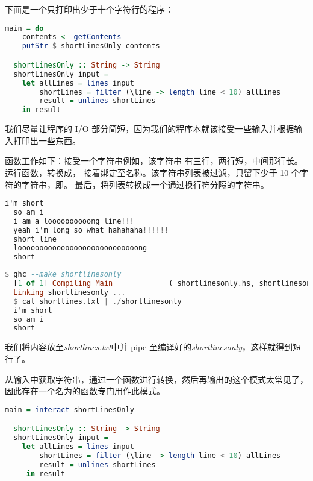 \documentclass[./main.tex]{subfiles}
\begin{document}
下面是一个只打印出少于十个字符行的程序：

\begin{lstlisting}[language=Haskell]
  main = do
    contents <- getContents
    putStr $ shortLinesOnly contents

  shortLinesOnly :: String -> String
  shortLinesOnly input =
    let allLines = lines input
        shortLines = filter (\line -> length line < 10) allLines
        result = unlines shortLines
    in result
\end{lstlisting}

我们尽量让程序的 I/O 部分简短，因为我们的程序本就该接受一些输入并根据输入打印出一些东西。

函数工作如下：接受一个字符串例如，该字符串
有三行，两行短，中间那行长。运行函数，转换成，
接着绑定至名称。该字符串列表被过滤，只留下少于 10 个字符的字符串，即。
最后，将列表转换成一个通过换行符分隔的字符串。

\begin{lstlisting}[language=Haskell]
  i'm short
  so am i
  i am a loooooooooong line!!!
  yeah i'm long so what hahahaha!!!!!!
  short line
  loooooooooooooooooooooooooooong
  short
\end{lstlisting}

\begin{lstlisting}[language=Haskell]
  $ ghc --make shortlinesonly
  [1 of 1] Compiling Main             ( shortlinesonly.hs, shortlinesonly.o )
  Linking shortlinesonly ...
  $ cat shortlines.txt | ./shortlinesonly
  i'm short
  so am i
  short
\end{lstlisting}

我们将内容放至\textit{shortlines.txt}中并 pipe 至编译好的\textit{shortlinesonly}，这样就得到短行了。

从输入中获取字符串，通过一个函数进行转换，然后再输出的这个模式太常见了，因此存在一个名为的函数专门用作此模式。

\begin{lstlisting}[language=Haskell]
  main = interact shortLinesOnly

  shortLinesOnly :: String -> String
  shortLinesOnly input =
    let allLines = lines input
        shortLines = filter (\line -> length line < 10) allLines
        result = unlines shortLines
     in result
\end{lstlisting}
\end{document}
